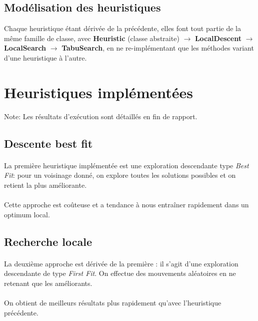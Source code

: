 \documentclass[a4paper,10pt]{report}
\begin{document}
\subsection{Modélisation des heuristiques}
Chaque heuristique étant dérivée de la précédente, elles font tout partie de la même famille de classe,
avec \textbf{Heuristic} (classe abstraite) $\to$ \textbf{LocalDescent} $\to$ \textbf{LocalSearch} $\to$
\textbf{TabuSearch}, en ne re-implémentant que les méthodes variant d'une heuristique à l'autre.

\pagebreak
\section{Heuristiques implémentées}
Note: Les résultats d'exécution sont détaillés en fin de rapport.
\subsection{Descente best fit}
\paragraph{}
La première heuristique implémentée est une exploration descendante type \textit{Best Fit}: pour un voisinage donné, on explore toutes les solutions possibles et on retient la plus améliorante.

\paragraph{}
Cette approche est coûteuse et a tendance à nous entraîner rapidement dans un optimum local.


\subsection{Recherche locale}
\paragraph{}
La deuxième approche est dérivée de la première : il s'agit d'une exploration descendante de type \textit{First Fit}. On effectue des mouvements aléatoires en ne retenant que les améliorants.

\paragraph{}
On obtient de meilleurs résultats plus rapidement qu'avec l'heuristique précédente.
\end{document}

